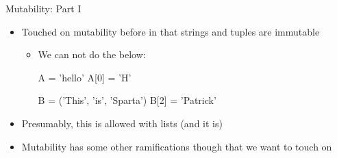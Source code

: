 \documentclass[pdf, aspectratio=169, 12pt]{beamer}
\begin{document}
\begin{frame}[fragile]{Mutability: Part I}
	\begin{itemize}
		\item<1-> Touched on mutability before in that strings and tuples are immutable
			\begin{itemize}
				\item We can \alert{not} do the below:
					\begin{pythoncode}
						A = 'hello'
						A[0] = 'H'

						B = ('This', 'is', 'Sparta')
						B[2] = 'Patrick'
					\end{pythoncode}
			\end{itemize}
		\item<2-> Presumably, this is allowed with lists (and it is)
		\item<2-> Mutability has some other ramifications though that we want to touch on
	\end{itemize}
\end{frame}
\end{document}
